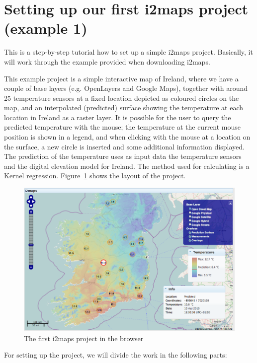 \documentclass[11pt]{article}
\begin{document}
\section{Setting up our first i2maps project (example 1)}

This is a step-by-step tutorial how to set up a simple i2maps project. Basically, it will work through the example provided when downloading i2maps.

This example project is a simple interactive map of Ireland, where we have a couple of base layers (e.g. OpenLayers and Google Maps), together with around 25 temperature sensors at a fixed location depicted as coloured circles on the map, and an interpolated (predicted) surface showing the temperature at each location in Ireland as a raster layer. It is possible for the user to query the predicted temperature with the mouse; the temperature at the current mouse position is shown in a legend, and when clicking with the mouse at a location on the surface, a new circle is inserted and some additional information displayed. The prediction of the temperature uses as input data the temperature sensors and the digital elevation model for Ireland. The method used for calculating is a Kernel regression. Figure~\ref{fig:ex1_layout} shows the layout of the project.

\begin{figure}
	\begin{center}
	\includegraphics[width=12cm]{figures/ex1_layout.png}
	\caption{The first i2maps project in the browser}
	\label{fig:ex1_layout}
	\end{center}
\end{figure}

For setting up the project, we will divide the work in the following parts:
\end{document}
